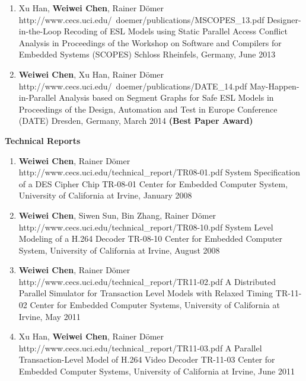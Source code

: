 \begin{enumerate}
	
\item
	\mypubhl
	{Xu Han, \textbf{Weiwei Chen}, Rainer D\"{o}mer}
	{http://www.cecs.uci.edu/~doemer/publications/MSCOPES_13.pdf}
	{Designer-in-the-Loop Recoding of ESL Models using Static Parallel Access Conflict Analysis}
	{in Proceedings of }
	{the Workshop on Software and Compilers for Embedded Systems (SCOPES)}
	{Schloss Rheinfels, Germany, June 2013}
	
\item
	\mypubhl
	{\textbf{Weiwei Chen}, Xu Han, Rainer D\"{o}mer}
	{http://www.cecs.uci.edu/~doemer/publications/DATE_14.pdf}
	{May-Happen-in-Parallel Analysis based on Segment Graphs for Safe ESL Models}
	{in Proceedings of }
	{the Design, Automation and Test in Europe Conference  (DATE)}
	{Dresden, Germany, March 2014 \textbf{(Best Paper Award)}}
\end{enumerate}



\vspace{5mm}
{\textbf{\large Technical Reports}}
\vspace{-2mm}
\begin{enumerate}
\item
	\mypubhl
	{\textbf{Weiwei Chen}, Rainer D\"{o}mer}
	{http://www.cecs.uci.edu/technical_report/TR08-01.pdf}
	{System Specification of a DES Cipher Chip}
	{}
	{TR-08-01}
	{Center for Embedded Computer System, University of California at Irvine, January 2008}
	
	
\item
	\mypubhl
	{\textbf{Weiwei Chen}, Siwen Sun, Bin Zhang, Rainer D\"{o}mer}
	{http://www.cecs.uci.edu/technical_report/TR08-10.pdf}
	{System Level Modeling of a H.264 Decoder}
	{}
	{TR-08-10}
	{Center for Embedded Computer System, University of California at Irvine, August 2008}
	
	
	
\item
	\mypubhl
	{\textbf{Weiwei Chen}, Rainer D\"{o}mer}
	{http://www.cecs.uci.edu/technical_report/TR11-02.pdf}
	{A Distributed Parallel Simulator for Transaction Level Models with Relaxed Timing}
	{}
	{TR-11-02}
	{Center for Embedded Computer Systems, University of California at Irvine, May 2011}
	
\item
	\mypubhl
	{Xu Han, \textbf{Weiwei Chen}, Rainer D\"{o}mer}
	{http://www.cecs.uci.edu/technical_report/TR11-03.pdf}
	{A Parallel Transaction-Level Model of H.264 Video Decoder}
	{}
	{TR-11-03} 
	{Center for Embedded Computer Systems, University of California at Irvine, June 2011}
\end{enumerate}

